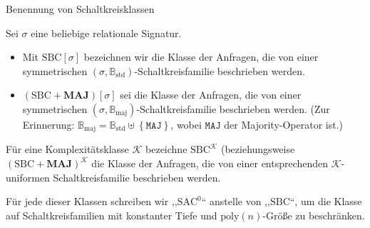 \begin{defn}
Benennung von Schaltkreisklassen

Sei $\sigma$ eine beliebige relationale Signatur.

\begin{itemize}
\item Mit $\mathrm{SBC}\left[\sigma\right]$ bezeichnen wir die Klasse der
Anfragen, die von einer symmetrischen\textbf{ $\left(\sigma,\mathbb{B}_{\mathrm{std}}\right)$}-Schaltkreisfamilie
beschrieben werden.
\item $\left(\mathrm{SBC}+\mathbf{MAJ}\right)\left[\sigma\right]$ sei die
Klasse der Anfragen, die von einer symmetrischen\textbf{ $\left(\sigma,\mathbb{B}_{\mathrm{maj}}\right)$}-Schaltkreisfamilie
beschrieben werden. (Zur Erinnerung: $\mathbb{B}_{\mathrm{maj}}=\mathbb{B}_{\mathrm{std}}\uplus\left\{ \mathtt{MAJ}\right\} $,
wobei $\mathtt{MAJ}$ der Majority-Operator ist.)
\end{itemize}
Für eine Komplexitätsklasse $\mathcal{K}$ bezeichne $\mathrm{SBC}^{\mathcal{K}}$
(beziehungsweise $\left(\mathrm{SBC}+\mathbf{MAJ}\right)^{\mathcal{K}}$
die Klasse der Anfragen, die von einer entsprechenden $\mathcal{K}$-uniformen
Schaltkreisfamilie beschrieben werden.

Für jede dieser Klassen schreiben wir ,,$\mathrm{SAC}^{0}$`` anstelle
von ,,$\mathrm{SBC}$``, um die Klasse auf Schaltkreisfamilien mit
konstanter Tiefe und $\mathrm{poly}\left(n\right)$-Größe zu beschränken.
\end{defn}

